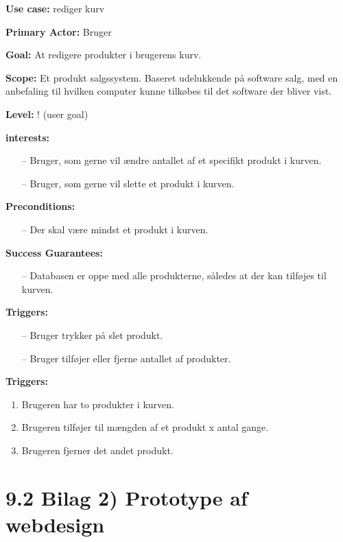 \documentclass[11pt]{report}
\begin{document}
\noindent \textbf{Use case:} rediger kurv

\noindent \textbf{Primary Actor:} Bruger

\noindent \textbf{Goal:} At redigere produkter i brugerens kurv. 

\noindent \textbf{Scope:} Et produkt salgssystem. Baseret udelukkende på software salg, med en anbefaling til hvilken computer kunne tilkøbes til det software der bliver vist.

\noindent \textbf{Level:} ! (user goal) 

\noindent \textbf{interests:}
\begin{itemize}[topsep=0pt, partopsep=0pt]
  \item[--] Bruger, som gerne vil ændre antallet af et specifikt produkt i kurven.
  \item[--] Bruger, som gerne vil slette et produkt i kurven. 
\end{itemize}

\noindent \textbf{Preconditions:}
\begin{itemize}[topsep=0pt, partopsep=0pt]
  \item[--] Der skal være mindst et produkt i kurven.
\end{itemize}

\newpage
\noindent \textbf{Success Guarantees: }
\begin{itemize}[topsep=0pt, partopsep=0pt]
  \item[--] Databasen er oppe med alle produkterne, således at der kan tilføjes til kurven.
\end{itemize}

\noindent \textbf{Triggers:}
\begin{itemize}[topsep=0pt, partopsep=0pt]
  \item[--] Bruger trykker på slet produkt.
  \item[--] Bruger tilføjer eller fjerne antallet af produkter.
\end{itemize}

\noindent \textbf{Triggers:}
\begin{enumerate}[topsep=0pt, partopsep=0pt]
  \item Brugeren har to produkter i kurven.
  \item Brugeren tilføjer til mængden af et produkt x antal gange.
  \item Brugeren fjerner det andet produkt.
\end{enumerate}


\newpage
\section*{9.2 Bilag 2) Prototype af webdesign}
\end{document}
